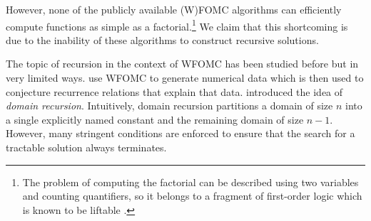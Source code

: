
However, none of the publicly available (W)FOMC algorithms can efficiently
compute functions as simple as a factorial.\footnote{The problem of computing
  the factorial can be described using two variables and counting quantifiers,
  so it belongs to a fragment of first-order logic which is known to be liftable
  \citep{DBLP:journals/jair/Kuzelka21}.} We claim that this shortcoming is due
to the inability of these algorithms to construct recursive solutions.


The topic of recursion in the context of WFOMC has been studied before but in
very limited ways.  use WFOMC to generate
numerical data which is then used to conjecture recurrence relations that
explain that data.  introduced the idea of
\emph{domain recursion}. Intuitively, domain recursion partitions a domain of
size $n$ into a single explicitly named constant and the remaining domain of
size $n-1$. However, many stringent conditions are enforced to ensure that the
search for a tractable solution always terminates.



